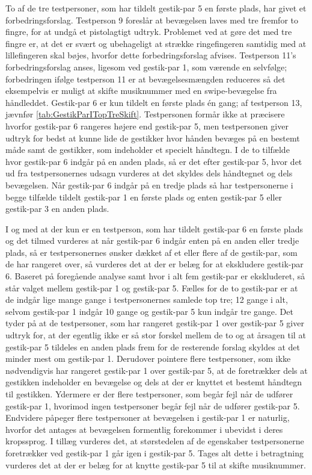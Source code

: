 To af de tre testpersoner, som har tildelt gestik-par 5 en første plads, har givet et forbedringsforslag. Testperson 9 foreslår at bevægelsen laves med tre fremfor to fingre, for at undgå et pistolagtigt udtryk. Problemet ved at gøre det med tre fingre er, at det er svært og ubehageligt at strække ringefingeren samtidig med at lillefingeren skal bøjes, hvorfor dette forbedringsforslag afvises. Testperson 11's forbedringsforslag anses, ligesom ved gestik-par 1, som værende en selvfølge; forbedringen ifølge testperson 11 er at bevægelsesmængden reduceres så det eksempelvis er muligt at skifte musiknummer med en swipe-bevægelse fra håndleddet.\blankline
%                
Gestik-par 6 er kun tildelt en første plads én gang; af testperson 13, jævnfør \autoref{tab:GestikParITopTreSkift}. Testpersonen formår ikke at præcisere hvorfor gestik-par 6 rangeres højere end gestik-par 5, men testpersonen giver udtryk for bedst at kunne lide de gestikker hvor hånden bevæges på en bestemt måde samt de gestikker, som indeholder et specielt håndtegn. I de to tilfælde hvor gestik-par 6 indgår på en anden plads, så er det efter gestik-par 5, hvor det ud fra testpersonernes udsagn vurderes at det skyldes dels håndtegnet og dels bevægelsen. Når gestik-par 6 indgår på en tredje plads så har testpersonerne i begge tilfælde tildelt gestik-par 1 en første plads og enten gestik-par 5 eller gestik-par 3 en anden plads. 

I og med at der kun er en testperson, som har tildelt gestik-par 6 en første plads og det tilmed vurderes at når gestik-par 6 indgår enten på en anden eller tredje plads, så er testpersonernes ønsker dækket af et eller flere af de gestik-par, som de har rangeret over, så vurderes det at der er belæg for at ekskludere gestik-par 6.\blankline
%
Baseret på foregående analyse samt  hvor i alt fem gestik-par er ekskluderet, så står valget mellem gestik-par 1 og gestik-par 5. Fælles for de to gestik-par er at de indgår lige mange gange i testpersonernes samlede top tre; 12 gange i alt, selvom gestik-par 1 indgår 10 gange og gestik-par 5 kun indgår tre gange. Det tyder på at de testpersoner, som har rangeret gestik-par 1 over gestik-par 5 giver udtryk for, at der egentlig ikke er så stor forskel mellem de to og at årsagen til at gestik-par 5 tildeles en anden plads frem for de resterende forslag skyldes at det minder mest om gestik-par 1. Derudover pointere flere testpersoner, som ikke nødvendigvis har rangeret gestik-par 1 over gestik-par 5, at de foretrækker dels at gestikken indeholder en bevægelse og dels at der er knyttet et bestemt håndtegn til gestikken. Ydermere er der flere testpersoner, som begår fejl når de udfører gestik-par 1, hvorimod ingen testpersoner begår fejl når de udfører gestik-par 5. Endvidere påpeger flere testpersoner at bevægelsen i gestik-par 1 er naturlig, hvorfor det antages at bevægelsen formentlig forekommer i ubevidst i deres kropssprog. I tillæg vurderes det, at størstedelen af de egenskaber testpersonerne foretrækker ved gestik-par 1 går igen i gestik-par 5. Tages alt dette i betragtning vurderes det at der er belæg for at knytte gestik-par 5 til at skifte musiknummer.          

